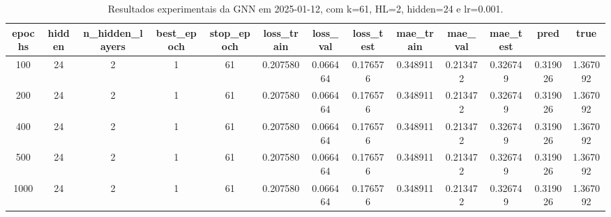 \begin{table}[h]
\centering
\caption{Resultados experimentais da GNN em 2025-01-12, com k=61, HL=2, hidden=24 e lr=0.001.}
\label{tab:gnn_results_k61_hl2_h24_d20250112}
\begin{tabular}{ccccccccccccc}
\toprule
epochs & hidden & n\_hidden\_layers & best\_epoch & stop\_epoch & loss\_train & loss\_val & loss\_test & mae\_train & mae\_val & mae\_test & pred & true \\
\midrule
100 & 24 & 2 & 1 & 61 & 0.207580 & 0.066464 & 0.176576 & 0.348911 & 0.213472 & 0.326749 & 0.319026 & 1.367092 \\
200 & 24 & 2 & 1 & 61 & 0.207580 & 0.066464 & 0.176576 & 0.348911 & 0.213472 & 0.326749 & 0.319026 & 1.367092 \\
400 & 24 & 2 & 1 & 61 & 0.207580 & 0.066464 & 0.176576 & 0.348911 & 0.213472 & 0.326749 & 0.319026 & 1.367092 \\
500 & 24 & 2 & 1 & 61 & 0.207580 & 0.066464 & 0.176576 & 0.348911 & 0.213472 & 0.326749 & 0.319026 & 1.367092 \\
1000 & 24 & 2 & 1 & 61 & 0.207580 & 0.066464 & 0.176576 & 0.348911 & 0.213472 & 0.326749 & 0.319026 & 1.367092 \\
\bottomrule
\end{tabular}
\end{table}
